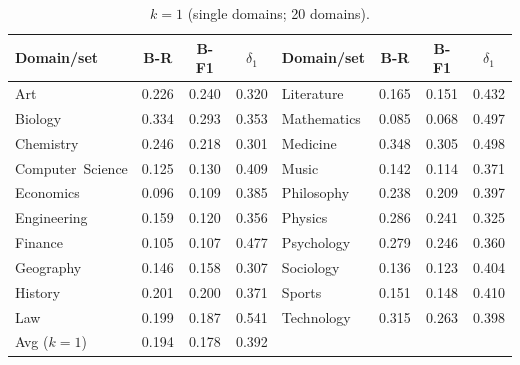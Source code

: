 \begin{table}[!ht]
\caption{\textbf{Turn-1 direct composition effect with paired before/after controls.}
For each exact domain set $S$ at $k{=}4$, we report across-model aggregates of Before (mean-of-constituents single-domain controls), After (composed turn~1), and $\Delta{=}\mathrm{After}-\mathrm{Before}$ for Recall (R) and F1-score (F1), along with entry difficulty $\delta_1$.
Each $k$ block includes an Avg row.}
\label{tab:d2_turn1_before_after}
\centering
\small
\setlength{\tabcolsep}{3.2pt}
\renewcommand{\arraystretch}{1.08}

\begin{subtable}[t]{\textwidth}
\caption{$k{=}1$ (single domains; 20 domains).}
\centering
\begin{tabular}{lccc@{\hspace{1.5em}}lccc}
\toprule
Domain/set &
B-R & B-F1 &
$\delta_1$ &
Domain/set &
B-R & B-F1 &
$\delta_1$ \\
\midrule
Art                 & 0.226 & 0.240 & 0.320 &
Literature          & 0.165 & 0.151 & 0.432 \\
Biology             & 0.334 & 0.293 & 0.353 &
Mathematics         & 0.085 & 0.068 & 0.497 \\
Chemistry           & 0.246 & 0.218 & 0.301 &
Medicine            & 0.348 & 0.305 & 0.498 \\
Computer\ Science   & 0.125 & 0.130 & 0.409 &
Music               & 0.142 & 0.114 & 0.371 \\
Economics           & 0.096 & 0.109 & 0.385 &
Philosophy          & 0.238 & 0.209 & 0.397 \\
Engineering         & 0.159 & 0.120 & 0.356 &
Physics             & 0.286 & 0.241 & 0.325 \\
Finance             & 0.105 & 0.107 & 0.477 &
Psychology          & 0.279 & 0.246 & 0.360 \\
Geography           & 0.146 & 0.158 & 0.307 &
Sociology           & 0.136 & 0.123 & 0.404 \\
History             & 0.201 & 0.200 & 0.371 &
Sports              & 0.151 & 0.148 & 0.410 \\
Law                 & 0.199 & 0.187 & 0.541 &
Technology          & 0.315 & 0.263 & 0.398 \\
\midrule
Avg ($k{=}1$) & 0.194 & 0.178 & 0.392 & & & & \\
\bottomrule
\end{tabular}
\end{subtable}


\end{table}
